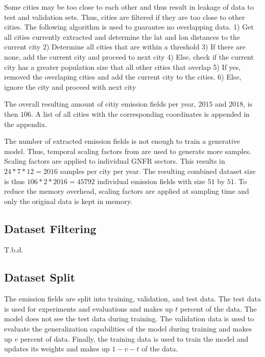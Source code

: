 Some cities may be too close to each other and thus result in leakage of data to test and validation sets.
Thus, cities are filtered if they are too close to other cities.
The following algorithm is used to guarantee no overlapping data.
1) Get all cities currently extracted and determine the lat and lon distances to the current city
2) Determine all cities that are within a threshold
3) If there are none, add the current city and proceed to next city
4) Else, check if the current city has a greater population size that all other cities that overlap
5) If yes, removed the overlaping cities and add the current city to the cities.
6) Else, ignore the city and proceed with next city

The overall resulting amount of citiy emission fields per year, $2015$ and $2018$, is then $106$.
A list of all cities with the corresponding coordinates is appended in the appendix.

The number of extracted emission fields is not enough to train a generative model.
Thus, temporal scaling factors from \parencite{ScalingFactors} are used to generate more samples.
Scaling factors are applied to individual GNFR sectors.
This results in $24 * 7 * 12 = 2016$ samples per city per year.
The resulting combined dataset size is thus $106 * 2 * 2016 = 45792$ individual emission fields with size $51$ by $51$.
To reduce the memory overhead, scaling factors are applied at sampling time and only the original data is kept in memory.

\subsection{Dataset Filtering}
T.b.d.

\subsection{Dataset Split}
The emission fields are split into training, validation, and test data.
The test data is used for experiments and evaluations and makes up $t$ percent of the data.
The model does not see the test data during training.
The validation data is used to evaluate the generalization capabilities of the model during training and makes up $v$ percent of data.
Finally, the training data is used to train the model and updates its weights and makes up $1 - v - t$ of the data.

